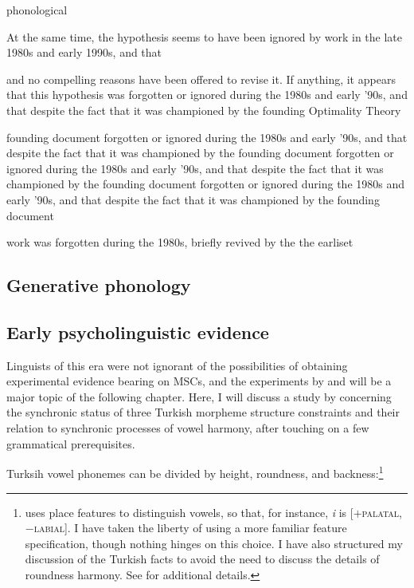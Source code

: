phonological

At the same time, the hypothesis seems to have been ignored by work in the late 1980s and early 1990s, and that 

and no compelling reasons have been offered to revise it. If anything, it appears that this hypothesis was forgotten or ignored during the 1980s and early '90s, and that despite the fact that it was championed by the founding Optimality Theory


 founding document forgotten or ignored during the 1980s and early '90s, and that despite the fact that it was championed by the founding document forgotten or ignored during the 1980s and early '90s, and that despite the fact that it was championed by the founding document forgotten or ignored during the 1980s and early '90s, and that despite the fact that it was championed by the founding document 

 work was forgotten during the 1980s, briefly revived by the the earliset 

\subsection{Generative phonology}


\subsection{Early psycholinguistic evidence}

Linguists of this era were not ignorant of the possibilities of obtaining experimental evidence bearing on MSCs, and the experiments by \citet{Greenberg1964} and \citet{Scholes1966} will be a major topic of the following chapter. Here, I will discuss a study by \citet{Zimmer1969} concerning the synchronic status of three Turkish morpheme structure constraints and their relation to synchronic processes of vowel harmony, after touching on a few grammatical prerequisites.

Turksih vowel phonemes can be divided by height, roundness, and backness:\footnote{\citeauthor{Zimmer1969} uses place features to distinguish vowels, so that, for instance, \emph{i} is [$+$\textsc{palatal}, $-$\textsc{labial}]. I have taken the liberty of using a more familiar feature specification, though nothing hinges on this choice. I have also structured my discussion of the Turkish facts to avoid the need to discuss the details of roundness harmony. See \citealt{Zimmer1969} for additional details.}

